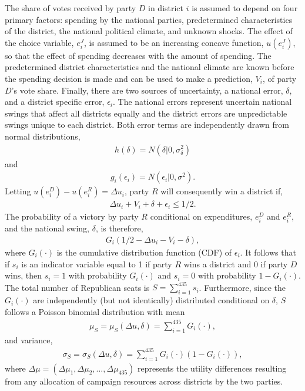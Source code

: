\documentclass[12pt,final,fleqn]{article}
\theoremstyle{plain}
\begin{document}
The share of votes received by party $D$ in district $i$ is assumed to depend on four primary factors: spending by the national parties, predetermined characteristics of the district, the national political climate, and unknown shocks. The effect of the choice variable, $e^J_i$, is assumed to be an increasing concave function, $u(e^J_i)$, so that the effect of spending decreases with the amount of spending. The predetermined district characteristics and the national climate are known before the spending decision is made and can be used to make a prediction, $V_i$, of party $D$'s vote share. Finally, there are two sources of uncertainty, a national error, $\delta$, and a district specific error, $\epsilon_i$. The national errors represent uncertain national swings that affect all districts equally and the district errors are unpredictable swings unique to each district. Both error terms are independently drawn from normal distributions,
\begin{align}
h(\delta) = N(\delta|0, \sigma^2_\delta)
\end{align}
and 
\begin{align}
g_i(\epsilon_i) = N(\epsilon_i|0, \sigma^2).
\end{align}
Letting $u(e^D_i) - u(e^R_i) = \Delta u_i$, party $R$ will consequently win a district if,
\begin{align} \label{eqn: Republican wins}
\Delta u_i + V_i + \delta + \epsilon_i \leq 1/2.
\end{align}
The probability of a victory by party $R$ conditional on expenditures, $e^D_i$ and $e^R_i$, and the national swing, $\delta$, is therefore,
\begin{align*}
G_i(1/2 - \Delta u_i - V_i - \delta),
\end{align*}
where $G_i(\cdot)$ is the cumulative distribution function (CDF) of $\epsilon_i$. It follows that if $s_i$ is an indicator variable equal to 1 if party $R$ wins a district and $0$ if party $D$ wins, then $s_i = 1$ with probability $G_i(\cdot)$ and $s_i = 0$ with probability $1 - G_i(\cdot)$. The total number of Republican seats is $S = \sum_{i=1}^{435} s_i$. Furthermore, since the $G_i(\cdot)$ are independently (but not identically) distributed conditional on $\delta$, $S$ follows a Poisson binomial distribution with mean
\begin{align} \label{eqn: conditional seat mean}
\mu_S = \mu_S(\Delta u, \delta) =  \sum_{i=1}^{435} G_i(\cdot),
\end{align}
and variance,
\begin{align} \label{eqn: conditional seat variance}
\sigma_S = \sigma_S(\Delta u, \delta) = \sum_{i=1}^{435} G_i(\cdot)(1 - G_i(\cdot)),
\end{align}
where $\Delta \mu = \left(\Delta \mu_1, \Delta \mu_2, \ldots, \Delta \mu_{435} \right)$ represents the utility differences resulting from any allocation of campaign resources across districts by the two parties.
\end{document}
